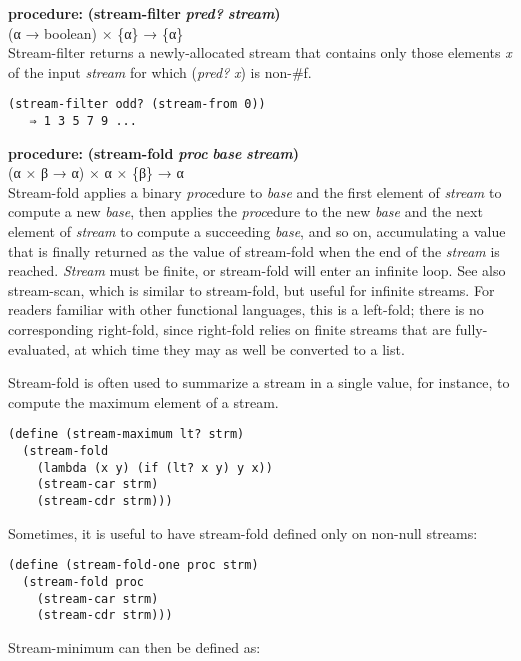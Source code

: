 \textbf{procedure:} \textbf{(stream-filter} \textbf{\emph{pred?}}
\textbf{} \textbf{\emph{stream})}\\
(α → boolean) × \{α\} → \{α\}\\
Stream-filter returns a newly-allocated stream that contains only those
elements \emph{x} of the input \emph{stream} for which (\emph{pred?}
\emph{x}) is non-\#f.

\begin{verbatim}
(stream-filter odd? (stream-from 0))
   ⇒ 1 3 5 7 9 ...
\end{verbatim}

\textbf{procedure:} \textbf{(stream-fold} \textbf{\emph{proc}} \textbf{}
\textbf{\emph{base}} \textbf{} \textbf{\emph{stream})}\\
(α × β → α) × α × \{β\} → α\\
Stream-fold applies a binary \emph{proc}edure to \emph{base} and the
first element of \emph{stream} to compute a new \emph{base}, then
applies the \emph{proc}edure to the new \emph{base} and the next element
of \emph{stream} to compute a succeeding \emph{base}, and so on,
accumulating a value that is finally returned as the value of
stream-fold when the end of the \emph{stream} is reached. \emph{Stream}
must be finite, or stream-fold will enter an infinite loop. See also
stream-scan, which is similar to stream-fold, but useful for infinite
streams. For readers familiar with other functional languages, this is a
left-fold; there is no corresponding right-fold, since right-fold relies
on finite streams that are fully-evaluated, at which time they may as
well be converted to a list.

Stream-fold is often used to summarize a stream in a single value, for
instance, to compute the maximum element of a stream.

\begin{verbatim}
(define (stream-maximum lt? strm)
  (stream-fold
    (lambda (x y) (if (lt? x y) y x))
    (stream-car strm)
    (stream-cdr strm)))
\end{verbatim}

Sometimes, it is useful to have stream-fold defined only on non-null
streams:

\begin{verbatim}
(define (stream-fold-one proc strm)
  (stream-fold proc
    (stream-car strm)
    (stream-cdr strm)))
\end{verbatim}

Stream-minimum can then be defined as:

